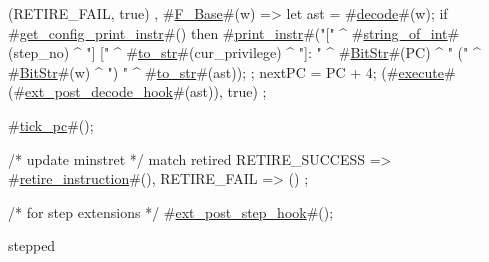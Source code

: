 {{{{{{              (RETIRE_FAIL, true)
             }
          },
          #\hyperref[sailRISCVzFzyBase]{F\_Base}#(w) => {
            let ast = #\hyperref[sailRISCVzdecode]{decode}#(w);
            if   #\hyperref[sailRISCVzgetzyconfigzyprintzyinstr]{get\_config\_print\_instr}#()
            then {
              #\hyperref[sailRISCVzprintzyinstr]{print\_instr}#("[" ^ #\hyperref[sailRISCVzstringzyofzyint]{string\_of\_int}#(step_no) ^ "] [" ^ #\hyperref[sailRISCVztozystr]{to\_str}#(cur_privilege) ^ "]: " ^ #\hyperref[sailRISCVzBitStr]{BitStr}#(PC) ^ " (" ^ #\hyperref[sailRISCVzBitStr]{BitStr}#(w) ^ ") " ^ #\hyperref[sailRISCVztozystr]{to\_str}#(ast));
            };
            nextPC = PC + 4;
            (#\hyperref[sailRISCVzexecute]{execute}#(#\hyperref[sailRISCVzextzypostzydecodezyhook]{ext\_post\_decode\_hook}#(ast)), true)
          }
        }
      }
    };

  #\hyperref[sailRISCVztickzypc]{tick\_pc}#();

  /* update minstret */
  match retired {
    RETIRE_SUCCESS => #\hyperref[sailRISCVzretirezyinstruction]{retire\_instruction}#(),
    RETIRE_FAIL    => ()
  };

  /* for step extensions */
  #\hyperref[sailRISCVzextzypostzystepzyhook]{ext\_post\_step\_hook}#();

  stepped
}
